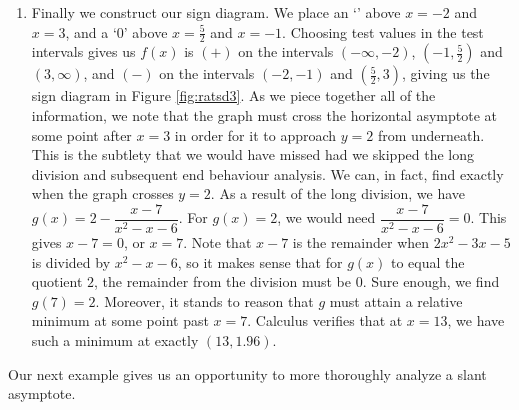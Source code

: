 {\begin{enumerate}
\begin{itemize}
\end{itemize}

Our end behaviour (again, without labels on the $x$-axis) is given in Figure \ref{fig:ratgraph6}.



\item  Finally we construct our sign diagram.  We place an `\textinterrobang' above $x=-2$ and $x=3$, and a `$0$' above $x = \frac{5}{2}$ and $x=-1$.  Choosing test values in the test intervals gives us $f(x)$ is $(+)$ on the intervals $(-\infty, -2)$, $\left(-1, \frac{5}{2}\right)$ and $(3, \infty)$, and $(-)$ on the intervals $(-2,-1)$ and $\left(\frac{5}{2}, 3\right)$, giving us the sign diagram in Figure \ref{fig:ratsd3}.  As we piece together all of the information, we note that the graph must cross the horizontal asymptote at some point after $x=3$ in order for it to approach $y=2$ from underneath.  This is the subtlety that we would have missed had we skipped the long division and subsequent end behaviour analysis.  We can, in fact, find exactly when the graph crosses $y=2$.  As a result of the long division, we have $g(x) =  2 - \dfrac{x-7}{x^2-x-6}$.  For $g(x) = 2$, we would need $\dfrac{x-7}{x^2-x-6} = 0$. This gives $x-7= 0$, or $x=7$.  Note that $x-7$ is the remainder when $2x^2-3x-5$ is divided by $x^2-x-6$, so it makes sense that for $g(x)$ to equal the quotient $2$, the remainder from the division must be $0$.  Sure enough, we find $g(7)=2$.  Moreover, it stands to reason that $g$ must attain a relative minimum at some point past $x=7$.  Calculus verifies that at $x=13$, we have such a minimum at exactly $(13, 1.96)$.  





\end{enumerate}
}

\medskip

Our next example gives us an opportunity to more thoroughly analyze a slant asymptote.

